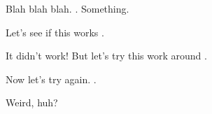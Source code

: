 \documentclass{article}
\begin{document}
Blah blah blah. \citet{CharnessDufwenberg2006}. Something.

Let's see if this works \citep[\textit{c.f.},][]{CharnessDufwenberg2006}.

It didn't work! But let's try this work around \citep{BeattieLoomes1997}.

Now let's try again. \citep[\textit{c.f.},][]{CharnessDufwenberg2006}.

Weird, huh?
\end{document}
